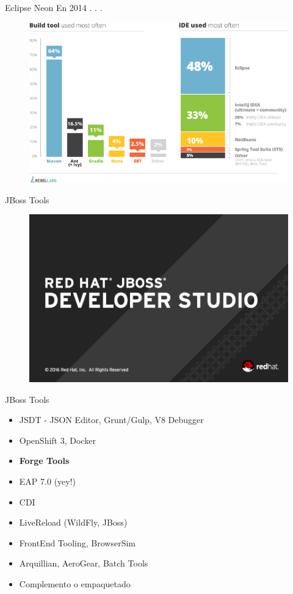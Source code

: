\documentclass{beamer}
\begin{document}
\begin{frame}{Eclipse Neon}
	En 2014 . . .
	\begin{figure}
		\centering
		\includegraphics[width=0.9\linewidth]{Images/ide}
	\end{figure}
\end{frame}

\begin{frame}{JBoss Tools}
	\begin{figure}
		\centering
		\includegraphics[width=0.9\linewidth]{Images/devstudio10}
	\end{figure}
\end{frame}

\begin{frame}{JBoss Tools}
	\begin{itemize}
		\item JSDT - JSON Editor, Grunt/Gulp, V8 Debugger
		\item OpenShift 3, Docker
		\item \textbf{Forge Tools}
		\item EAP 7.0 (yey!)
		\item CDI
		\item LiveReload (WildFly, JBoss)
		\item FrontEnd Tooling, BrowserSim
		\item Arquillian, AeroGear, Batch Tools
		\item Complemento o empaquetado
	\end{itemize}
\end{frame}
\end{document}
